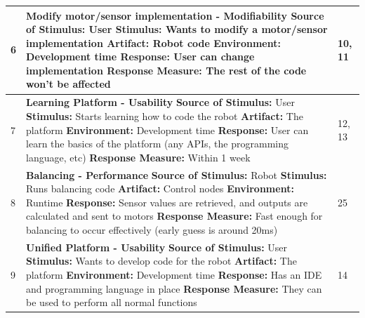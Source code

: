\documentclass{fank1basedocument}
\begin{document}
\begin{center}
	\begin{tabular}{|p{}|>{\raggedright\arraybackslash}p{}|p{}|}
		\hline
		6 & \large{\textbf{Modify motor/sensor implementation - Modifiability}}\newline
				\textbf{Source of Stimulus:} User\newline
				\textbf{Stimulus:} Wants to modify a motor/sensor implementation\newline
				\textbf{Artifact:} Robot code\newline
				\textbf{Environment:} Development time\newline
				\textbf{Response:} User can change implementation\newline
				\textbf{Response Measure:} The rest of the code won’t be affected
			& 10, 11\\
		\hline
		7 & \large{\textbf{Learning Platform - Usability}}\newline
				\textbf{Source of Stimulus:} User\newline
				\textbf{Stimulus:} Starts learning how to code the robot\newline
				\textbf{Artifact:} The platform\newline
				\textbf{Environment:} Development time\newline
				\textbf{Response:} User can learn the basics of the platform (any APIs, the programming language, etc)\newline
				\textbf{Response Measure:} Within 1 week
			& 12, 13\\
		\hline
		8 & \large{\textbf{Balancing - Performance}}\newline
				\textbf{Source of Stimulus:} Robot\newline
				\textbf{Stimulus:} Runs balancing code\newline
				\textbf{Artifact:} Control nodes\newline
				\textbf{Environment:} Runtime\newline
				\textbf{Response:} Sensor values are retrieved, and outputs are calculated and sent to motors\newline
				\textbf{Response Measure:} Fast enough for balancing to occur effectively (early guess is around 20ms)
			& 25\\
		\hline
		9 & \large{\textbf{Unified Platform - Usability}}\newline
				\textbf{Source of Stimulus:} User\newline
				\textbf{Stimulus:} Wants to develop code for the robot\newline
				\textbf{Artifact:} The platform\newline
				\textbf{Environment:} Development time\newline
				\textbf{Response:} Has an IDE and programming language in place\newline
				\textbf{Response Measure:} They can be used to perform all normal functions
			& 14\\
		\hline
	\end{tabular}
\end{center}
\end{document}
